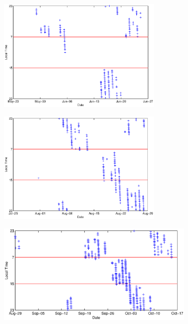 \documentclass[a4paper,11pt]{article}
\begin{document}
\newpage

\begin{figure}[htbp]
\begin{minipage}{1.0\hsize}
\begin{center}
\includegraphics[width =8cm]{PlotTime2011_1.eps}
\\
\end{center}
\end{minipage}
\begin{minipage}{1.0\hsize}
\begin{center}
\includegraphics[width =8cm]{PlotTime2011_2.eps}
\\
\end{center}
\end{minipage}
\begin{minipage}{1.0\hsize}
\begin{center}
\includegraphics[width =9.6cm]{PlotTime2011_3.eps}
\\
\end{center}

\end{minipage}
\end{figure}
\end{document}
